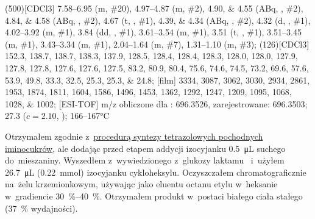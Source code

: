 \begin{fullexp}
	\NMR(500)[CDCl3] \numrange{7.58}{6.95} (m, \#{20}), \numrange{4.97}{4.87} (m, \#{2}), \numlist{4.90;4.55} (ABq, , \#{2}), \numlist{4.84;4.58} (ABq, , \#{2}), \num{4.67} (t, , \#{1}), \numlist{4.39;4.34} (ABq, , \#{2}), \num{4.32} (d, , \#{1}), \numrange{4.02}{3.92} (m, \#{1}), \num{3.84} (dd, , \#{1}), \numrange{3.61}{3.54} (m, \#{1}), \num{3.51} (t, , \#{1}), \numrange{3.51}{3.45} (m, \#{1}), \numrange{3.43}{3.34} (m, \#{1}), \numrange{2.04}{1.64} (m, \#{7}), \numrange{1.31}{1.10} (m, \#{3});
	(126)[CDCl3] \numlist{152.3; 138.7; 138.7; 138.3; 137.9; 128.5; 128.4; 128.4; 128.3; 128.0; 128.0; 127.9; 127.8; 127.8; 127.6; 127.6; 127.5; 83.2; 80.9; 80.4; 75.6; 74.6; 74.5; 73.2; 69.6; 57.6; 53.9; 49.8; 33.3; 32.5; 25.3; 25.3; 24.8};
	[film] \numlist{3334; 3087; 3062; 3030; 2934; 2861; 1953; 1874; 1811; 1604; 1586; 1496; 1453; 1362; 1292; 1247; 1209; 1095; 1068; 1028; 1002};
	[ESI-TOF] m/z obliczone dla : \num{696.3526}, zarejestrowane: \num{696.3503};
	\data{[$\alpha^{23}_D$]~$=$} \num{27.3} ($c = 2.10$, );
	 \numrange{166}{167}\si{\celsius}
\end{fullexp}

Otrzymałem zgodnie z~\hyperref[experimental:sugars:schwartz]{procedurą syntezy tetrazolowych
	pochodnych iminocukrów}, ale dodając przed etapem addycji izocyjanku
	\SI{0.5}{\micro\liter} suchego  do~mieszaniny.
Wyszedłem z~wywiedzionego z~glukozy laktamu~
	i~użyłem \SI{26.7}{\micro\liter} (\SI{0.22}{\milli\mol}) izocyjanku cykloheksylu.
Oczyszczałem chromatograficznie na~żelu krzemionkowym,
	używając jako eluentu octanu etylu w~heksanie w~gradiencie \SIrange{30}{40}{\percent}.
Otrzymałem produkt w~postaci białego ciała stałego (\SI{37}{\percent} wydajności).

